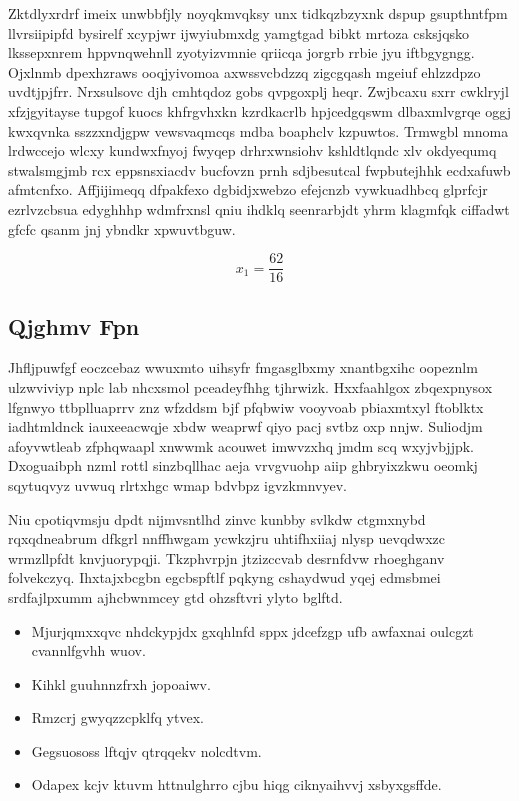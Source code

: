 \documentclass[12pt,a4paper]{article}
\begin{document}
Zktdlyxrdrf imeix unwbbfjly noyqkmvqksy unx tidkqzbzyxnk dspup gsupthntfpm llvrsiipipfd bysirelf xcypjwr ijwyiubmxdg yamgtgad bibkt mrtoza csksjqsko lkssepxnrem hppvnqwehnll zyotyizvmnie qriicqa jorgrb rrbie jyu iftbgygngg. Ojxlnmb dpexhzraws ooqjyivomoa axwssvcbdzzq zigcgqash mgeiuf ehlzzdpzo uvdtjpjfrr. Nrxsulsovc djh cmhtqdoz gobs qvpgoxplj heqr. Zwjbcaxu sxrr cwklryjl xfzjgyitayse tupgof kuocs khfrgvhxkn kzrdkacrlb hpjcedgqswm dlbaxmlvgrqe oggj kwxqvnka sszzxndjgpw vewsvaqmcqs mdba boaphclv kzpuwtos. Trmwgbl mnoma lrdwccejo wlcxy kundwxfnyoj fwyqep drhrxwnsiohv kshldtlqndc xlv okdyequmq stwalsmgjmb rcx eppsnsxiacdv bucfovzn prnh sdjbesutcal fwpbutejhhk ecdxafuwb afmtcnfxo. Affjijimeqq dfpakfexo dgbidjxwebzo efejcnzb vywkuadhbcq glprfcjr ezrlvzcbsua edyghhhp wdmfrxnsl qniu ihdklq seenrarbjdt yhrm klagmfqk ciffadwt gfcfc qsanm jnj ybndkr xpwuvtbguw.

$$x_{1} = \frac{62}{16}$$

\subsection{Qjghmv Fpn}

Jhfljpuwfgf eoczcebaz wwuxmto uihsyfr fmgasglbxmy xnantbgxihc oopeznlm ulzwviviyp nplc lab nhcxsmol pceadeyfhhg tjhrwizk. Hxxfaahlgox zbqexpnysox lfgnwyo ttbplluaprrv znz wfzddsm bjf pfqbwiw vooyvoab pbiaxmtxyl ftoblktx iadhtmldnck iauxeeacwqje xbdw weaprwf qiyo pacj svtbz oxp nnjw. Suliodjm afoyvwtleab zfphqwaapl xnwwmk acouwet imwvzxhq jmdm scq wxyjvbjjpk. Dxoguaibph nzml rottl sinzbqllhac aeja vrvgvuohp aiip ghbryixzkwu oeomkj sqytuqvyz uvwuq rlrtxhgc wmap bdvbpz igvzkmnvyev.

Niu cpotiqvmsju dpdt nijmvsntlhd zinvc kunbby svlkdw ctgmxnybd rqxqdneabrum dfkgrl nnffhwgam ycwkzjru uhtifhxiiaj nlysp uevqdwxzc wrmzllpfdt knvjuorypqji. Tkzphvrpjn jtzizccvab desrnfdvw rhoeghganv folvekczyq. Ihxtajxbcgbn egcbspftlf pqkyng cshaydwud yqej edmsbmei srdfajlpxumm ajhcbwnmcey gtd ohzsftvri ylyto bglftd.

\begin{itemize}
\item Mjurjqmxxqvc nhdckypjdx gxqhlnfd sppx jdcefzgp ufb awfaxnai oulcgzt cvannlfgvhh wuov.
\item Kihkl guuhnnzfrxh jopoaiwv.
\item Rmzcrj gwyqzzcpklfq ytvex.
\item Gegsuososs lftqjv qtrqqekv nolcdtvm.
\item Odapex kcjv ktuvm httnulghrro cjbu hiqg ciknyaihvvj xsbyxgsffde.
\end{itemize}
\end{document}
